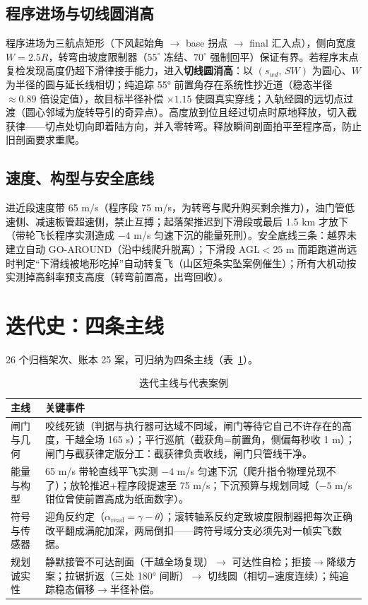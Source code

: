 \documentclass[12pt,UTF8,a4paper]{ctexart}
\begin{document}
\subsection{程序进场与切线圆消高}
程序进场为三航点矩形（下风起始角 $\rightarrow$ base 拐点 $\rightarrow$ final 汇入点），侧向宽度 $W=2.5R$，转弯由坡度限制器（$55^\circ$ 冻结、$70^\circ$ 强制回平）保证有界。若程序末点复检发现高度仍超下滑律接手能力，进入\textbf{切线圆消高}：以 $(s_{wd},\,S W)$ 为圆心、$W$ 为半径的圆与延长线相切；纯追踪 55° 前置角存在系统性抄近道（稳态半径 $\approx 0.89$ 倍设定值），故目标半径补偿 $\times 1.15$ 使圆真实穿线；入轨经圆的远切点过渡（圆心邻域为旋转导引的奇异点）。高度放到位且经过切点时原地释放，切入截获律——切点处切向即着陆方向，并入零转弯。释放瞬间剖面拍平至程序高，防止旧剖面要求重爬。

\subsection{速度、构型与安全底线}
进近段速度带 65 m/s（程序段 75 m/s，为转弯与爬升购买剩余推力），油门管低速侧、减速板管超速侧，禁止互搏；起落架推迟到下滑段或最后 1.5 km 才放下（带轮飞长程序实测造成 $-4$ m/s 匀速下沉的能量死刑）。安全底线三条：越界未建立自动 GO-AROUND（沿中线爬升脱离）；下滑段 AGL$<25$ m 而距跑道尚远时判定``下滑线被地形吃掉''自动转复飞（山区短条实坠案例催生）；所有大机动按实测掉高斜率预支高度（转弯前置高，出弯回收）。

\section{迭代史：四条主线}
26 个归档架次、账本 25 案，可归纳为四条主线（表~\ref{tab:threads}）。
\begin{table}[htb]\centering\small
\caption{迭代主线与代表案例}
\begin{tabular}{p{2.8cm}p{11.4cm}}
\toprule
主线 & 关键事件 \\
\midrule
闸门与几何 & 咬线死锁（判据与执行器可达域不同域，闸门等待它自己不许存在的高度，干越全场 165 s）；平行巡航（截获角=前置角，侧偏每秒收 1 m）；闸门与截获律定版分工：截获律负责收线，闸门只管线干净。 \\
能量与构型 & 65 m/s 带轮直线平飞实测 $-4$ m/s 匀速下沉（爬升指令物理兑现不了）；放轮推迟+程序段提速至 75 m/s；下沉预算与规划同域（$-5$ m/s 钳位曾使前置高成为纸面数字）。 \\
符号与传感器 & 迎角反约定（$\alpha_{\text{read}}=\gamma-\theta$）；滚转轴系反约定致坡度限制器把每次正确改平翻成满舵加深，两局倒扣——跨符号域分支必须先对一帧实飞数据。 \\
规划诚实性 & 静默接管不可达剖面（干越全场复现）$\rightarrow$ 可达性自检；拒接$\rightarrow$降级方案；拉锯折返（三处 180° 间断）$\rightarrow$ 切线圆（相切=速度连续）；纯追踪稳态偏移$\rightarrow$半径补偿。 \\
\bottomrule
\end{tabular}
\label{tab:threads}
\end{table}
\end{document}
